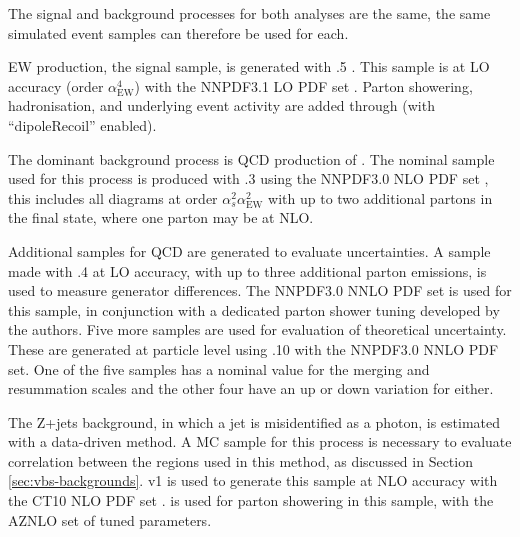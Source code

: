 

The signal and background processes for both analyses are the same, the same
simulated event samples can therefore be used for each.

\ac{EW} \Zyjj production, the signal sample, is generated with .5 \cite{madgraph5amc}.  This sample is at \ac{LO} accuracy (order
$\alpha_\text{EW}^4$) with the NNPDF3.1 \ac{LO} \ac{PDF} set \cite{NNPDF3dot1}.
Parton showering, hadronisation, and underlying event activity are added through
 \cite{pythia8dot2} (with ``dipoleRecoil'' enabled).

The dominant background process is \ac{QCD} production of \Zyjj. The nominal
sample used for this process is produced with .3
\cite{madgraph5amc} using the NNPDF3.0 \ac{NLO} \ac{PDF} set \cite{NNPDF3dot0},
this includes all diagrams at order $\alpha_s^2\alpha_\text{EW}^2$ with up to
two additional partons in the final state, where one parton may be at \ac{NLO}.

Additional samples for \ac{QCD} \Zyjj are generated to evaluate uncertainties.
A sample made with .4 \cite{sherpa2dot2} at \ac{LO} accuracy, with up
to three additional parton emissions, is used to measure generator differences.
The NNPDF3.0 \ac{NNLO} \ac{PDF} set is used for this sample, in conjunction with
a dedicated parton shower tuning developed by the \sherpa authors.
%
Five more samples are used for evaluation of theoretical uncertainty. These are
generated at particle level using .10 \cite{sherpa2dot2} with the
NNPDF3.0 \ac{NNLO} \ac{PDF} set.  One of the five samples has a nominal value
for the merging and resummation scales and the other four have an up or down
variation for either.


The Z+jets background, in which a jet is misidentified as a photon, is estimated
with a data-driven method. A \ac{MC} sample for this process is necessary to
evaluate correlation between the regions used in this method, as discussed in
Section \ref{sec:vbs-backgrounds}.
\powhegbox v1 \cite{Nason2004,powheg,powhegbox}
is used to generate this sample at \ac{NLO} accuracy with the CT10 \ac{NLO}
\ac{PDF} set \cite{ct10}.
 \cite{pythia8dot2}
is used for parton showering in this sample, with the AZNLO \cite{AZNLOtune}
set of tuned parameters.

